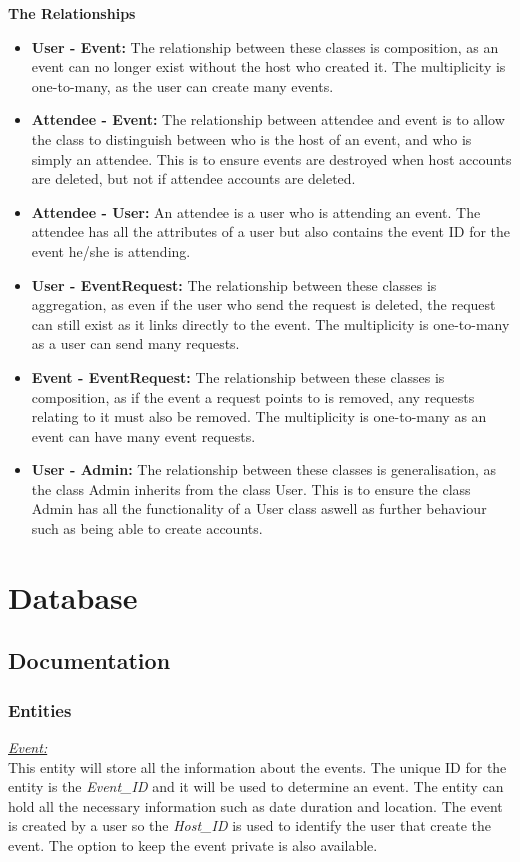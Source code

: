\documentclass[a4paper]{article}
\begin{document}
\textbf{The Relationships}
\begin{itemize}
    \item \textbf{User - Event:} The relationship between these classes is composition, as an event can no longer exist without the host who created it. The multiplicity is one-to-many, as the user can create many events.
    \item \textbf{Attendee - Event:} The relationship between attendee and event is to allow the class to distinguish between who is the host of an event, and who is simply an attendee. This is to ensure events are destroyed when host accounts are deleted, but not if attendee accounts are deleted.
    \item \textbf{Attendee - User:} An attendee is a user who is attending an event. The attendee has all the attributes of a user but also contains the event ID for the event he/she is attending.
    \item \textbf{User - EventRequest:} The relationship between these classes is aggregation, as even if the user who send the request is deleted, the request can still exist as it links directly to the event. The multiplicity is one-to-many as a user can send many requests.
    \item \textbf{Event - EventRequest:} The relationship between these classes is composition, as if the event a request points to is removed, any requests relating to it must also be removed. The multiplicity is one-to-many as an event can have many event requests.
    \item \textbf{User - Admin:} The relationship between these classes is generalisation, as the class Admin inherits from the class User. This is to ensure the class Admin has all the functionality of a User class aswell as further behaviour such as being able to create accounts.
\end{itemize}
\section{Database}
\subsection{Documentation}
\subsubsection{Entities}
\underline{\textit{Event:}} \\
This entity will store all the information about the events. The unique ID for the entity is the \textit{Event\_ID} and it will be used to determine an event. The entity can hold all the necessary information such as date duration and location. The event is created by a user so the \textit{Host\_ID} is used to identify the user that create the event. The option to keep the event private is also available. 
\end{document}
